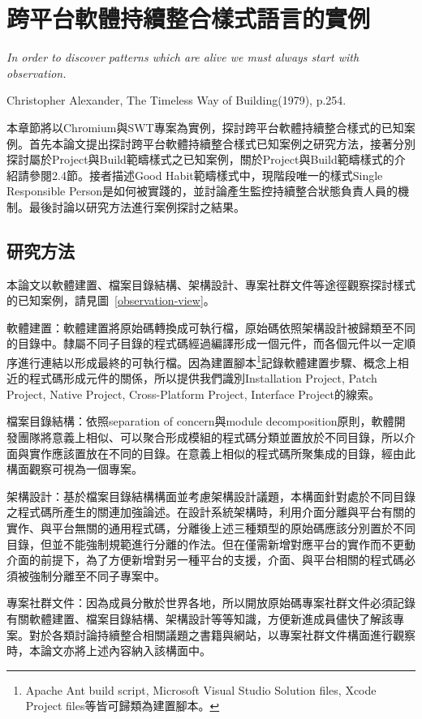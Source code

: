 \chapter{跨平台軟體持續整合樣式語言的實例}
\vfill
\textit{In order to discover patterns which are alive we must always start with observation.} \begin{flushright}Christopher Alexander, The Timeless Way of Building(1979), p.254.\end{flushright}
\vfill

本章節將以Chromium\cite{chromiumproject}與SWT\cite{swtproject}專案為實例，探討跨平台軟體持續整合樣式的已知案例。首先本論文提出探討跨平台軟體持續整合樣式已知案例之研究方法，接著分別探討屬於Project與Build範疇樣式之已知案例，關於Project與Build範疇樣式的介紹請參閱2.4節。接者描述Good Habit範疇樣式中，現階段唯一的樣式Single Responsible Person是如何被實踐的，並討論產生監控持續整合狀態負責人員的機制。最後討論以研究方法進行案例探討之結果。

\section{研究方法}

本論文以軟體建置、檔案目錄結構、架構設計、專案社群文件等途徑觀察探討樣式的已知案例，請見圖~\ref{observation-view}。%
\begin{description}
\item 軟體建置：軟體建置將原始碼轉換成可執行檔，原始碼依照架構設計被歸類至不同的目錄中。隸屬不同子目錄的程式碼經過編譯形成一個元件，而各個元件以一定順序進行連結以形成最終的可執行檔。因為建置腳本\footnote{Apache Ant build script, Microsoft Visual Studio Solution files, Xcode Project files等皆可歸類為建置腳本。}記錄軟體建置步驟、概念上相近的程式碼形成元件的關係，所以提供我們識別Installation Project, Patch Project, Native Project, Cross-Platform Project, Interface Project的線索。
\item 檔案目錄結構：依照separation of concern與module decomposition原則，軟體開發團隊將意義上相似、可以聚合形成模組的程式碼分類並置放於不同目錄，所以介面與實作應該置放在不同的目錄。在意義上相似的程式碼所聚集成的目錄，經由此構面觀察可視為一個專案。
\item 架構設計：基於檔案目錄結構構面並考慮架構設計議題，本構面針對處於不同目錄之程式碼所產生的關連加強論述。在設計系統架構時，利用介面分離與平台有關的實作、與平台無關的通用程式碼，分離後上述三種類型的原始碼應該分別置於不同目錄，但並不能強制規範進行分離的作法。但在僅需新增對應平台的實作而不更動介面的前提下，為了方便新增對另一種平台的支援，介面、與平台相關的程式碼必須被強制分離至不同子專案中。
\item 專案社群文件：因為成員分散於世界各地，所以開放原始碼專案社群文件必須記錄有關軟體建置、檔案目錄結構、架構設計等等知識，方便新進成員儘快了解該專案。對於各類討論持續整合相關議題之書籍與網站，以專案社群文件構面進行觀察時，本論文亦將上述內容納入該構面中。
\end{description}

